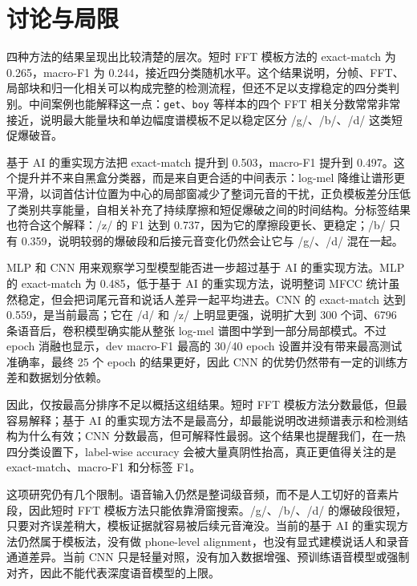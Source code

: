\section{讨论与局限}

四种方法的结果呈现出比较清楚的层次。短时 FFT 模板方法的 exact-match 为 0.265，macro-F1 为 0.244，接近四分类随机水平。这个结果说明，分帧、FFT、局部块和归一化相关可以构成完整的检测流程，但还不足以支撑稳定的四分类判别。中间案例也能解释这一点：\texttt{get}、\texttt{boy} 等样本的四个 FFT 相关分数常常非常接近，说明最大能量块和单边幅度谱模板不足以稳定区分 /g/、/b/、/d/ 这类短促爆破音。

基于 AI 的重实现方法把 exact-match 提升到 0.503，macro-F1 提升到 0.497。这个提升并不来自黑盒分类器，而是来自更合适的中间表示：log-mel 降维让谱形更平滑，以词首估计位置为中心的局部窗减少了整词元音的干扰，正负模板差分压低了类别共享能量，自相关补充了持续摩擦和短促爆破之间的时间结构。分标签结果也符合这个解释：/z/ 的 F1 达到 0.737，因为它的摩擦段更长、更稳定；/b/ 只有 0.359，说明较弱的爆破段和后接元音变化仍然会让它与 /g/、/d/ 混在一起。

MLP 和 CNN 用来观察学习型模型能否进一步超过基于 AI 的重实现方法。MLP 的 exact-match 为 0.485，低于基于 AI 的重实现方法，说明整词 MFCC 统计虽然稳定，但会把词尾元音和说话人差异一起平均进去。CNN 的 exact-match 达到 0.559，是当前最高；它在 /d/ 和 /z/ 上明显更强，说明扩大到 300 个词、6796 条语音后，卷积模型确实能从整张 log-mel 谱图中学到一部分局部模式。不过 epoch 消融也显示，dev macro-F1 最高的 30/40 epoch 设置并没有带来最高测试准确率，最终 25 个 epoch 的结果更好，因此 CNN 的优势仍然带有一定的训练方差和数据划分依赖。

因此，仅按最高分排序不足以概括这组结果。短时 FFT 模板方法分数最低，但最容易解释；基于 AI 的重实现方法不是最高分，却最能说明改进频谱表示和检测结构为什么有效；CNN 分数最高，但可解释性最弱。这个结果也提醒我们，在一热四分类设置下，label-wise accuracy 会被大量真阴性抬高，真正更值得关注的是 exact-match、macro-F1 和分标签 F1。

这项研究仍有几个限制。语音输入仍然是整词级音频，而不是人工切好的音素片段，因此短时 FFT 模板方法只能依靠滑窗搜索。/g/、/b/、/d/ 的爆破段很短，只要对齐误差稍大，模板证据就容易被后续元音淹没。当前的基于 AI 的重实现方法仍然属于模板法，没有做 phone-level alignment，也没有显式建模说话人和录音通道差异。当前 CNN 只是轻量对照，没有加入数据增强、预训练语音模型或强制对齐，因此不能代表深度语音模型的上限。
